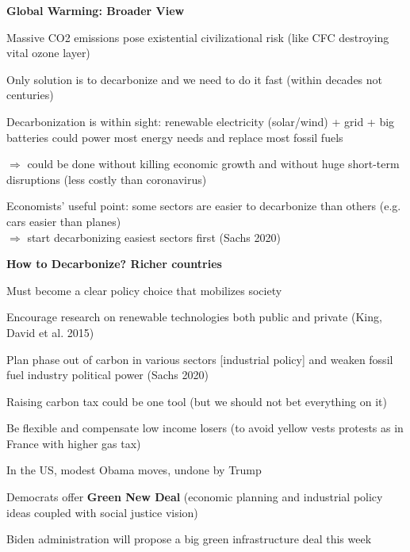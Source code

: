 \documentclass[landscape]{slides}
\begin{document}
\begin{slide}
\begin{center}
{\bf Global Warming:  Broader View}
\end{center}
Massive CO2 emissions pose existential civilizational risk (like CFC destroying vital ozone layer)

Only solution is to decarbonize and we need to do it fast (within decades not centuries)

Decarbonization is within sight: renewable electricity (solar/wind) + grid + big batteries could power
most energy needs and replace most fossil fuels

$\Rightarrow$ could be done without killing economic growth and without huge short-term disruptions (less costly
than coronavirus)

Economists' useful point: some sectors are easier to decarbonize than others (e.g. cars easier than planes)
\\ $\Rightarrow$ start decarbonizing easiest sectors first (Sachs 2020)

\end{slide}

\begin{slide}
\begin{center}
{\bf How to Decarbonize? Richer countries}
\end{center}
Must become a clear policy choice that mobilizes society 

Encourage research on renewable technologies both public and private
(King, David et al. 2015)

Plan phase out of carbon in various sectors [industrial policy] and weaken fossil fuel
industry political power (Sachs 2020)

Raising carbon tax could be one tool (but we should not bet everything on it)

Be flexible and compensate low income losers 
(to avoid yellow vests protests as in France with higher gas tax)

\small
In the US, modest Obama moves, undone by Trump

Democrats offer \textbf{Green New Deal} (economic planning and industrial policy ideas coupled with social justice vision)

Biden administration will propose a big green infrastructure deal this week

\end{slide}
\end{document}
